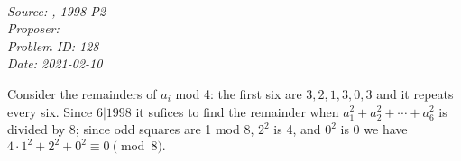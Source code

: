 \SSbreak\\
\emph{Source: \Cbmoo, 1998 P2}\\
\emph{Proposer: \Pbrain}\\
\emph{Problem ID: 128}\\
\emph{Date: 2021-02-10}\\
\SSbreak

\bigskip

\begin{solution}\hfil\medskip

   Consider the remainders of $a_i$ mod 4: the first six are $3, 2, 1, 3, 0, 3$ and it repeats every six. Since $6|1998$ it sufices to find the remainder
   when $a_1^2 + a_2^2 + \cdots + a_6^2$ is divided by 8; since odd squares are 1 mod 8, $2^2$ is 4, and $0^2$ is 0 we have $4 \cdot 1^2 + 2^2 + 0^2 \equiv \boxed{0}\pmod{8}.$
\end{solution}\bigskip